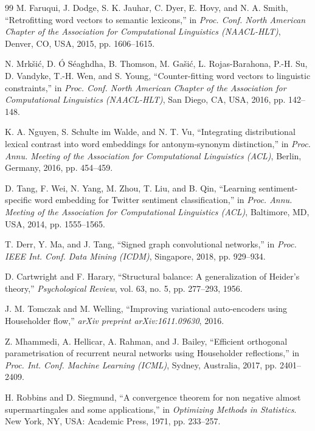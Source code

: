 \documentclass[journal]{IEEEtran}
\begin{document}
\begin{thebibliography}{99}
M. Faruqui, J. Dodge, S. K. Jauhar, C. Dyer, E. Hovy, and N. A. Smith, ``Retrofitting word vectors to semantic lexicons,'' in \emph{Proc. Conf. North American Chapter of the Association for Computational Linguistics (NAACL-HLT)}, Denver, CO, USA, 2015, pp. 1606--1615.

N. Mrk\v{s}i\'{c}, D. \'{O} S\'{e}aghdha, B. Thomson, M. Ga\v{s}i\'{c}, L. Rojas-Barahona, P.-H. Su, D. Vandyke, T.-H. Wen, and S. Young, ``Counter-fitting word vectors to linguistic constraints,'' in \emph{Proc. Conf. North American Chapter of the Association for Computational Linguistics (NAACL-HLT)}, San Diego, CA, USA, 2016, pp. 142--148.

K. A. Nguyen, S. Schulte im Walde, and N. T. Vu, ``Integrating distributional lexical contrast into word embeddings for antonym-synonym distinction,'' in \emph{Proc. Annu. Meeting of the Association for Computational Linguistics (ACL)}, Berlin, Germany, 2016, pp. 454--459.

D. Tang, F. Wei, N. Yang, M. Zhou, T. Liu, and B. Qin, ``Learning sentiment-specific word embedding for Twitter sentiment classification,'' in \emph{Proc. Annu. Meeting of the Association for Computational Linguistics (ACL)}, Baltimore, MD, USA, 2014, pp. 1555--1565.

T. Derr, Y. Ma, and J. Tang, ``Signed graph convolutional networks,'' in \emph{Proc. IEEE Int. Conf. Data Mining (ICDM)}, Singapore, 2018, pp. 929--934.

D. Cartwright and F. Harary, ``Structural balance: A generalization of Heider's theory,'' \emph{Psychological Review}, vol. 63, no. 5, pp. 277--293, 1956.

J. M. Tomczak and M. Welling, ``Improving variational auto-encoders using Householder flow,'' \emph{arXiv preprint arXiv:1611.09630}, 2016.

Z. Mhammedi, A. Hellicar, A. Rahman, and J. Bailey, ``Efficient orthogonal parametrisation of recurrent neural networks using Householder reflections,'' in \emph{Proc. Int. Conf. Machine Learning (ICML)}, Sydney, Australia, 2017, pp. 2401--2409.

H. Robbins and D. Siegmund, ``A convergence theorem for non negative almost supermartingales and some applications,'' in \emph{Optimizing Methods in Statistics}. New York, NY, USA: Academic Press, 1971, pp. 233--257.


\end{thebibliography}
\end{document}
